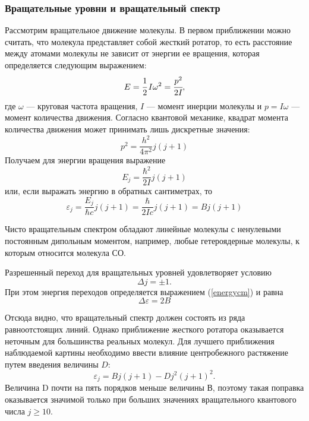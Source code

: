 \subsubsection{Вращательные уровни и вращательный спектр}
Рассмотрим вращательное движение молекулы. В первом приближении можно считать, что молекула представляет собой жесткий ротатор, то есть расстояние между атомами молекулы не зависит от энергии
ее вращения, которая определяется следующим выражением:
\begin{equation}
\label{eq:rot}
E=\cfrac{1}{2}\,I\omega^2 = \cfrac{p^2}{2I},
\end{equation}
где $\omega$ --- круговая частота вращения,  $I$ --- момент инерции молекулы и $p=I\omega$ --- момент количества движения. Согласно квантовой механике, квадрат момента количества движения может принимать лишь
дискретные значения:
\begin{equation}
p^2 = \frac{h^2}{4\pi^2}j(j+1)
\end{equation}
Получаем для энергии вращения выражение
\begin{equation}
E_j = \frac{\hbar^2}{2I}j(j+1)
\end{equation}
или, если выражать энергию в обратных сантиметрах, то
\begin{equation}
\varepsilon_j = \frac{E_j}{\hbar c}j(j+1) = \frac{\hbar}{2Ic}j(j+1) = Bj(j+1)
\label{energycm}
\end{equation}

Чисто вращательным спектром обладают линейные молекулы с ненулевыми постоянным дипольным моментом, например, любые гетероядерные молекулы, к которым относится молекула СО.

Разрешенный переход для вращательных уровней удовлетворяет условию 
\begin{equation}
\Delta j = \pm 1.
\end{equation}
При этом энергия переходов определяется выражением (\ref{energycm}) и равна 
\begin{equation}
\Delta \varepsilon = 2B
\end{equation}

Отсюда видно, что вращательный спектр должен состоять из ряда равноотстоящих линий. Однако приближение жесткого ротатора оказывается неточным для большинства реальных молекул. Для лучшего приближения наблюдаемой картины необходимо ввести влияние центробежного растяжение путем введения величины $D$:
\begin{equation}
\varepsilon_j = Bj(j+1) - Dj^2(j+1)^2.
\end{equation}
Величина D почти на пять порядков меньше величины В, поэтому такая поправка оказывается значимой только при больших значениях вращательного квантового числа $j \geq 10$.


